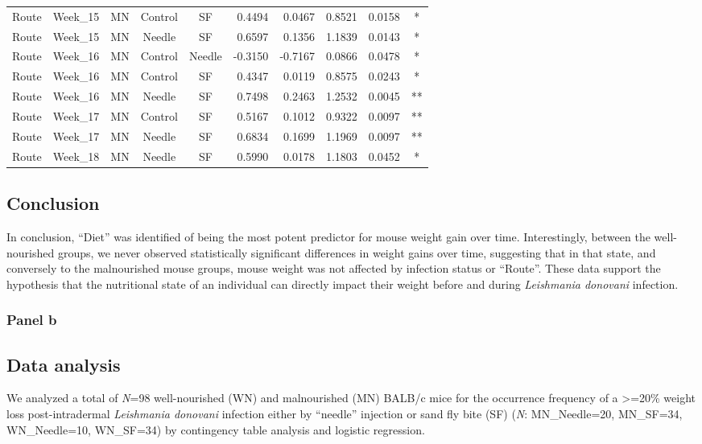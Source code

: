 \documentclass[
  12pt,
  letterpaper,
]{article}
\begin{document}
\begin{longtable}{lllccrrrrc}
Route & Week\_15 & MN & Control & SF & 0.4494 & 0.0467 & 0.8521 & 0.0158 & * \\ 
Route & Week\_15 & MN & Needle & SF & 0.6597 & 0.1356 & 1.1839 & 0.0143 & * \\ 
Route & Week\_16 & MN & Control & Needle & -0.3150 & -0.7167 & 0.0866 & 0.0478 & * \\ 
Route & Week\_16 & MN & Control & SF & 0.4347 & 0.0119 & 0.8575 & 0.0243 & * \\ 
Route & Week\_16 & MN & Needle & SF & 0.7498 & 0.2463 & 1.2532 & 0.0045 & ** \\ 
Route & Week\_17 & MN & Control & SF & 0.5167 & 0.1012 & 0.9322 & 0.0097 & ** \\ 
Route & Week\_17 & MN & Needle & SF & 0.6834 & 0.1699 & 1.1969 & 0.0097 & ** \\ 
Route & Week\_18 & MN & Needle & SF & 0.5990 & 0.0178 & 1.1803 & 0.0452 & * \\ 
\bottomrule
\end{longtable}
\endgroup

\subsection{Conclusion}\label{conclusion-2}

In conclusion, ``Diet'' was identified of being the most potent predictor for mouse weight gain over time. Interestingly, between the well-nourished groups, we never observed statistically significant differences in weight gains over time, suggesting that in that state, and conversely to the malnourished mouse groups, mouse weight was not affected by infection status or ``Route''. These data support the hypothesis that the nutritional state of an individual can directly impact their weight before and during \emph{Leishmania donovani} infection.

\subsubsection{Panel b}\label{panel-b-1}

\subsection{Data analysis}\label{data-analysis-5}

We analyzed a total of \emph{N}=98 well-nourished (WN) and malnourished (MN) BALB/c mice for the occurrence frequency of a \textgreater=20\% weight loss post-intradermal \emph{Leishmania donovani} infection either by ``needle'' injection or sand fly bite (SF) (\emph{N}: MN\_Needle=20, MN\_SF=34, WN\_Needle=10, WN\_SF=34) by contingency table analysis and logistic regression.
\end{document}
